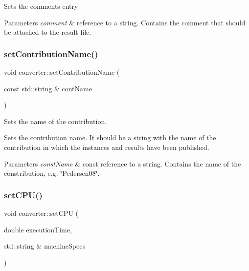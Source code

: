 Sets the comments entry 
\begin{DoxyParams}{Parameters}
{\em comment} & reference to a string. Contains the comment that should be attached to the result file. \\
\hline
\end{DoxyParams}
\mbox{\label{classconverter_a848a8e67f350303fc2d89a2be74a4c6d}} 
\subsubsection{\texorpdfstring{set\+Contribution\+Name()}{setContributionName()}}
{\footnotesize\ttfamily void converter\+::set\+Contribution\+Name (\begin{DoxyParamCaption}\item[{const std\+::string \&}]{cont\+Name }\end{DoxyParamCaption})\hspace{0.3cm}{\ttfamily [inline]}}



Sets the name of the contribution. 

Sets the contribution name. It should be a string with the name of the contribution in which the instances and results have been published. 
\begin{DoxyParams}{Parameters}
{\em const\+Name} & const reference to a string. Contains the name of the constribution, e.\+g. \char`\"{}\+Pedersen08\char`\"{}. \\
\hline
\end{DoxyParams}
\mbox{\label{classconverter_a3efdbf4704ecaa181f0c70f4ed80ce38}} 
\subsubsection{\texorpdfstring{set\+C\+P\+U()}{setCPU()}}
{\footnotesize\ttfamily void converter\+::set\+C\+PU (\begin{DoxyParamCaption}\item[{double}]{execution\+Time,  }\item[{std\+::string \&}]{machine\+Specs }\end{DoxyParamCaption})}

